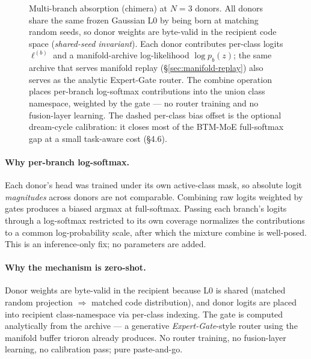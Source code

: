 \documentclass[11pt]{article}
\begin{document}
\begin{figure}[t]
\caption{Multi-branch absorption (chimera) at $N=3$ donors. All
donors share the same frozen Gaussian L0 by being born at matching
random seeds, so donor weights are byte-valid in the recipient code
space (\emph{shared-seed invariant}). Each donor contributes per-class
logits $\ell^{(b)}$ and a manifold-archive log-likelihood
$\log p_b(z)$; the same archive that serves manifold replay
(\S\ref{sec:manifold-replay}) also serves as the analytic Expert-Gate
router. The combine operation places per-branch log-softmax
contributions into the union class namespace, weighted by the gate ---
no router training and no fusion-layer learning. The dashed per-class
bias offset is the optional dream-cycle calibration: it closes most of
the BTM-MoE full-softmax gap at a small task-aware cost (\S4.6).}
\label{fig:chimera}
\end{figure}

\paragraph{Why per-branch log-softmax.} Each donor's head was trained
under its own active-class mask, so absolute logit \emph{magnitudes}
across donors are not comparable. Combining raw logits weighted by gates
produces a biased argmax at full-softmax. Passing each branch's logits
through a log-softmax restricted to its own coverage normalizes the
contributions to a common log-probability scale, after which the
mixture combine is well-posed. This is an inference-only fix; no
parameters are added.

\paragraph{Why the mechanism is zero-shot.} Donor weights are byte-valid
in the recipient because L0 is shared (matched random projection
$\Rightarrow$ matched code distribution), and donor logits are placed
into recipient class-namespace via per-class indexing. The gate is
computed analytically from the archive --- a generative
\emph{Expert-Gate}-style router \citep{aljundi2017expert} using the
manifold buffer trioron already produces. No router training, no
fusion-layer learning, no calibration pass; pure paste-and-go.
\end{document}
